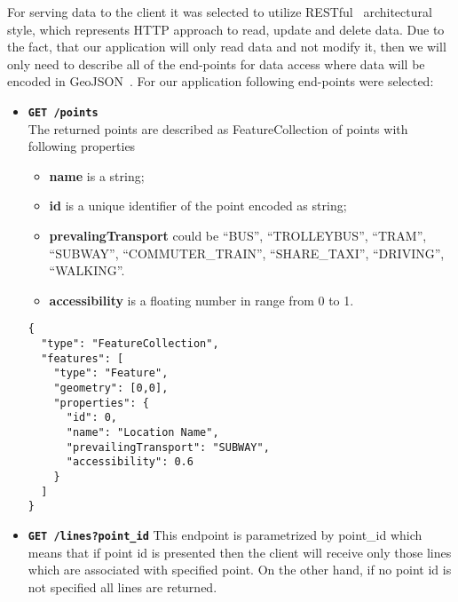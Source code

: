 For serving data to the client it was selected to utilize RESTful~\cite{rest:wiki} architectural
style, which represents HTTP approach to read, update and delete data. Due to the fact, that our
application will only read data and not modify it, then we will only need to describe all of
the end-points for data access where data will be encoded in GeoJSON~\cite{geojson:spec}.
For our application following end-points were selected:

\begin{itemize}
  \item \textbf{\texttt{GET /points}} \\
  The returned points are described as FeatureCollection of points with following properties
  \begin{itemize}
    \item \textbf{name} is a string;
    \item \textbf{id} is a unique identifier of the point encoded as string;
    \item \textbf{prevalingTransport} could be \mbox{``BUS''}, \mbox{``TROLLEYBUS''},
    \mbox{``TRAM''}, \\ \mbox{``SUBWAY''}, \mbox{``COMMUTER\_TRAIN''}, \mbox{``SHARE\_TAXI''},
    \mbox{``DRIVING''}, \\ \mbox{``WALKING''}.
    \item \textbf{accessibility} is a floating number in range from 0 to 1.
  \end{itemize}

  \begin{verbatim}
{
  "type": "FeatureCollection",
  "features": [
    "type": "Feature",
    "geometry": [0,0],
    "properties": {
      "id": 0,
      "name": "Location Name",
      "prevailingTransport": "SUBWAY",
      "accessibility": 0.6
    }
  ]
}
  \end{verbatim}

  \item \textbf{\texttt{GET /lines?point\_id}}
  This endpoint is parametrized by point\_id which means that if point id is presented
  then the client will receive only those lines which are associated with specified point.
  On the other hand, if no point id is not specified all lines are returned.


\end{itemize}
